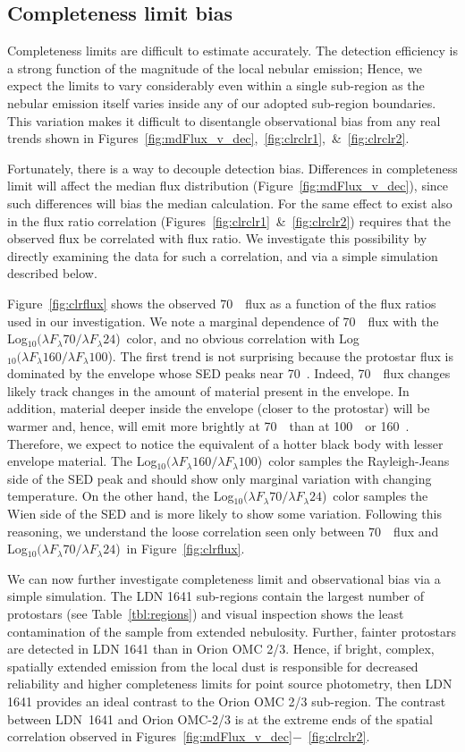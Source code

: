 \documentclass[manuscript]{aastex}
\newcommand{\clra}{Log$_{10}(\lambda F_\lambda70/\lambda F_\lambda24$)}
\newcommand{\clrb}{Log$_{10}(\lambda F_\lambda160/\lambda F_\lambda100$)}
\begin{document}
\subsection{Completeness limit bias}
\label{sec:compbias}
\par
Completeness limits are difficult to estimate accurately.  The detection efficiency is a strong function of the magnitude of the local nebular emission;  Hence, we expect the limits to vary considerably even within a single sub-region as the nebular emission itself varies inside any of our adopted sub-region boundaries.  This variation makes it difficult to disentangle observational bias from any real trends shown in Figures~\ref{fig:mdFlux_v_dec},~\ref{fig:clrclr1},~\&~\ref{fig:clrclr2}.
\par
Fortunately, there is a way to decouple detection bias.   Differences in completeness limit will affect the median flux distribution (Figure~\ref{fig:mdFlux_v_dec}), since such differences will bias the median calculation.  For the same effect to exist also in the flux ratio correlation (Figures~\ref{fig:clrclr1}~\&~\ref{fig:clrclr2}) requires that the observed flux be correlated with flux ratio.  We investigate this possibility by directly examining  the data for such a correlation, and via a simple simulation described below.
\par
Figure~\ref{fig:clrflux} shows the observed 70~\micron\ flux as a function of the flux ratios used in our investigation.  We note a marginal dependence of 70~\micron\ flux with the \clra\ color, and no obvious correlation with \clrb.  The first trend is not surprising because the protostar flux is dominated by the envelope whose SED peaks near 70~\micron.  Indeed, 70~\micron\ flux changes likely track changes in the amount of material present in the envelope.  In addition, material deeper inside the envelope (closer to the protostar) will be warmer and, hence, will emit more brightly at 70~\micron\ than at 100~\micron\ or 160~\micron.  Therefore, we expect to notice the equivalent of a hotter black body with lesser envelope material.  The \clrb\ color samples the Rayleigh-Jeans side of the SED peak and should show only marginal variation with changing temperature.  On the other hand, the \clra\ color samples the Wien side of the SED and is more likely to show some variation.  Following this reasoning, we understand the loose correlation seen only  between 70~\micron\ flux and \clra\ in Figure~\ref{fig:clrflux}.
\par
We can now further investigate completeness limit and observational bias via a simple simulation.  The LDN 1641 sub-regions contain the largest number of protostars (see Table~\ref{tbl:regions}) and visual inspection shows the least contamination of the sample from extended nebulosity. Further, fainter protostars are detected in LDN 1641 than in Orion OMC 2/3. Hence, if bright, complex, spatially extended emission from the local dust is responsible for decreased reliability and higher completeness limits for point source photometry, then LDN 1641 provides an ideal contrast to the Orion OMC 2/3 sub-region. The contrast between LDN~1641 and Orion OMC-2/3 is at the extreme ends of the spatial correlation observed in Figures~\ref{fig:mdFlux_v_dec}$-$~\ref{fig:clrclr2}.
\end{document}
